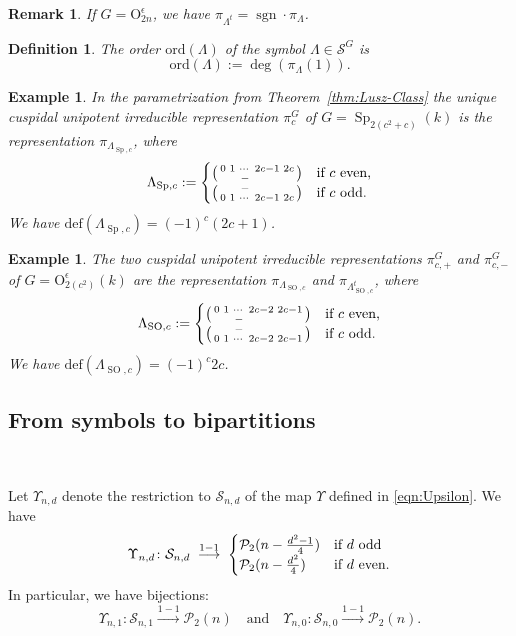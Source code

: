 \documentclass[12pt]{amsart}
\numberwithin{equation}{subsection}
\newtheorem{defn}[equation]{Definition}
\newtheorem{remark}[equation]{Remark}
\newtheorem{example}[equation]{Example}
\newcommand{\cP}{\mathcal{P}}
\newcommand{\cS}{\mathcal{S}}
\newcommand{\sgn}{\operatorname{sgn}}
\newcommand{\ord}{\operatorname{ord}}
\newcommand{\Sp}{\operatorname{Sp}}
\newcommand{\SO}{\operatorname{SO}}
\def\ord{\mathrm{ord}}
\def\rO{{\mathrm{O}}}
\def\defect{{\mathrm{def}}}
\begin{document}
\begin{remark}{\rm 
If $G=\rO_{2n}^\epsilon$, we have $\pi_{\Lambda^t}=\sgn\cdot\pi_\Lambda$.}
\end{remark}

\begin{defn} \label{defn:symbol-order} {\rm
The \textit{order} $\ord(\Lambda)$ of the symbol $\Lambda\in\cS^{G}$ is
\[\ord(\Lambda):=\deg(\pi_\Lambda(1)).\]
}
\end{defn}

\begin{example} {\rm 
In the parametrization from Theorem~\ref{thm:Lusz-Class} the unique cuspidal unipotent irreducible representation $\pi_c^G$ of $G=\Sp_{2(c^2+c)}(k)$  is the representation $\pi_{\Lambda_{\Sp,c}}$, where
\[\Lambda_{\Sp,c}:=\begin{cases}
\left(\begin{smallmatrix} 0&1&\cdots&2c-1&2c\cr
&&-&&\end{smallmatrix}\right)&\text{if $c$ even,}\cr
\left(\begin{smallmatrix} &&-&&\cr
0&1&\cdots&2c-1&2c
\end{smallmatrix}\right)&\text{if $c$ odd}.
\end{cases}\]
We have $\defect(\Lambda_{\Sp,c})=(-1)^c(2c+1)$.
}
\end{example}

\begin{example} {\rm The two cuspidal unipotent irreducible representations $\pi_{c,+}^G$ and $\pi_{c,-}^G$ of $G=\rO^\epsilon_{2(c^2)}(k)$  are the representation $\pi_{\Lambda_{\SO,c}}$ and $\pi_{\Lambda^t_{\SO,c}}$, 
 where
\[\Lambda_{\SO,c}:=\begin{cases}
\left(\begin{smallmatrix} 0&1&\cdots&2c-2&2c-1\cr
&&-&&\end{smallmatrix}\right)&\text{if $c$ even,}\cr
\left(\begin{smallmatrix} &&-&&\cr
0&1&\cdots&2c-2&2c-1
\end{smallmatrix}\right)&\text{if $c$ odd}.
\end{cases}\]
We have $\defect(\Lambda_{\SO,c})=(-1)^c2c$.
}
\end{example}

\subsection{From symbols to bipartitions}\

Let  $\Upsilon_{n,d}$ denote the restriction to $\cS_{n,d}$ of the map $\Upsilon$ defined in \eqref{eqn:Upsilon}. We have
\begin{equation}
\Upsilon_{n,d}\colon\cS_{n,d}\;\overset{1-1}{\longrightarrow}\;
\begin{cases}
\cP_2(n-\frac{d^2-1}{4})&\text{if $d$ odd}\cr
\cP_2(n-\frac{d^2}{4})&\text{if $d$ even}.
\end{cases}
\end{equation}
In particular, we have bijections:
\begin{equation}
\Upsilon_{n,1}\colon\cS_{n,1}\overset{1-1}{\longrightarrow}\cP_2(n) 
\quad\text{and}\quad
\Upsilon_{n,0}\colon\cS_{n,0}\overset{1-1}{\longrightarrow}\cP_2(n).
\end{equation}
\end{document}
